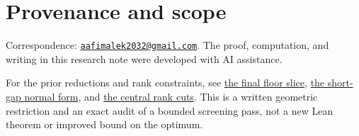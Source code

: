 \documentclass[
  11pt,
]{article}
\begin{document}
\section{Provenance and scope}\label{provenance-and-scope}

Correspondence:
\href{mailto:aafimalek2032@gmail.com}{\nolinkurl{aafimalek2032@gmail.com}}.
The proof, computation, and writing in this research note were developed
with AI assistance.

For the prior reductions and rank constraints, see
\href{https://github.com/Aafimalek/novel-discoveries/tree/c582f2587588eeeb195048a74552fe80bdc1d0e7/nine-separated-subset-sums/verification/rank-cuts-below-150/only-floor-148}{the
final floor slice},
\href{https://github.com/Aafimalek/novel-discoveries/tree/a49d954ffe00669ed70ac7cdd68ef4091263abbc/nine-separated-subset-sums/verification/rank-cuts-below-150/short-gap-normal-form}{the
short-gap normal form}, and
\href{https://github.com/Aafimalek/novel-discoveries/tree/63d79a72228169e68bca6f18ec54c97a5147422d/nine-separated-subset-sums/verification/rank-cuts-below-150}{the
central rank cuts}. This is a written geometric restriction and an exact
audit of a bounded screening pass, not a new Lean theorem or improved
bound on the optimum.
\end{document}

